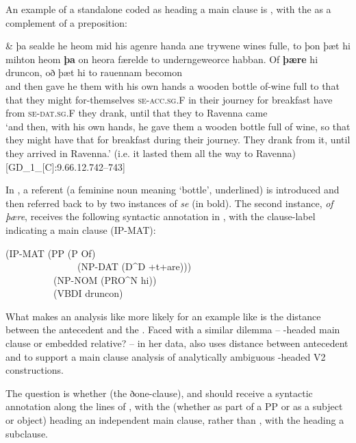\documentclass[output=paper,colorlinks,citecolor=brown]{langscibook}
\begin{document}
An example of a standalone  coded as heading a main clause is , with the  as a complement of a preposition:

 \ea\label{ex:los:13}
 \gll \& þa sealde he heom mid his agenre handa ane trywene \underline{} wines fulle, to þon þæt hi mihton heom \textbf{þa} on heora færelde to underngeweorce habban. Of \textbf{þære} hi druncon, oð þæt hi to rauennam becomon\\
and then gave he them with his own hands a wooden bottle of-wine full to that that they might for-themselves \textsc{se-acc.sg.F} in their journey for breakfast have from \textsc{se-dat.sg.F} they drank, until that they to Ravenna came\\
\glt ‘and then, with his own hands, he gave them a wooden bottle full of wine, so that they might have that for breakfast during their journey. They drank from it, until they arrived in Ravenna.' (i.e. it lasted them all the way to Ravenna) \hfill [GD\_1\_[C]:9.66.12.742--743]
\z

In , a referent (a feminine noun meaning ‘bottle', underlined) is introduced and then referred back to by two instances of \textit{se} (in bold). The second instance, \textit{of þære}, receives the following syntactic annotation in , with the clause-label indicating a main clause (IP-MAT):

 \ea\label{ex:los:14}
(IP-MAT (PP (P Of)\\
~~~~~~~~~~~~~~~(NP-DAT (D\^{}D +t+are)))\\
~~~~~~~~~~(NP-NOM (PRO\^{}N hi))\\
~~~~~~~~~~(VBDI druncon)\\
\z

What makes an analysis like  more likely for an example like  is the distance between the antecedent and the . Faced with a similar dilemma – -headed main clause or embedded relative? – in her  data, \citet{Schlachter2012} also uses distance between antecedent and  to support a main clause analysis of analytically ambiguous -headed V2 constructions.

The question is whether  (the ðone-clause),  and  should receive a syntactic annotation along the lines of , with the  (whether as part of a PP or as a subject or object) heading an independent main clause, rather than , with the  heading a subclause. \\
\end{document}
